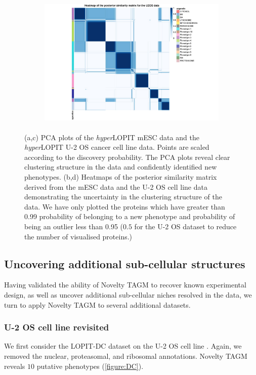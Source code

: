\documentclass[12pt,english]{article}
\begin{document}
\begin{figure}[ht]
\begin{subfigure}[t]{0.5\textwidth}
	\centering
	\includegraphics[height=2.5in]{heatmapuU2oshl.jpg}
	\caption{}
\end{subfigure}
	\caption{(a,c) PCA plots of the \textit{hyper}LOPIT mESC data and the \textit{hyper}LOPIT U-2 OS cancer cell line data. Points are scaled according to the discovery probability. The PCA plots reveal clear clustering structure in the data and confidently identified new phenotypes. (b,d) Heatmaps of the posterior similarity matrix derived from the mESC data and the U-2 OS cell line data demonstrating the uncertainty in the clustering structure of the data. We have only plotted the proteins which have greater than 0.99 probability of belonging to a new phenotype and probability of being an outlier less than 0.95 ($0.5$ for the U-2 OS dataset to reduce the number of visualised proteins.)}
	\label{figure:mouse}
\end{figure}
\clearpage
\subsection{Uncovering additional sub-cellular structures}
Having validated the ability of Novelty TAGM to recover known experimental design, as well as uncover additional sub-cellular niches resolved in the data, we turn to apply Novelty TAGM to several additional datasets.

\subsubsection{U-2 OS cell line revisited}
 We first consider the LOPIT-DC dataset on the U-2 OS cell line \citep{DC:2018}. Again, we removed the nuclear, proteasomal, and ribosomal annotations. Novelty TAGM reveals $10$ putative phenotypes (\ref{figure:DC}).
\end{document}
